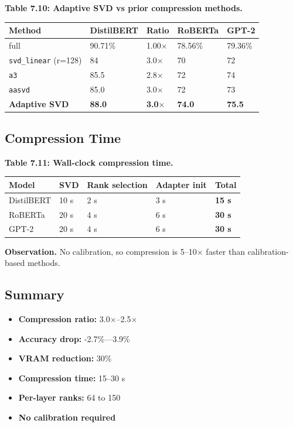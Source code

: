 \textbf{Table 7.10: Adaptive SVD vs prior compression methods.}

\begin{table}[H]
\centering
\small
\begin{tabular}{lllll}
\toprule
\textbf{Method} & \textbf{DistilBERT} & \textbf{Ratio} & \textbf{RoBERTa} & \textbf{GPT-2} \\
\midrule
full & 90.71\% & 1.00$\times$ & 78.56\% & 79.36\% \\
\texttt{svd\_linear} (r=128) & 84 & 3.0$\times$ & 70 & 72 \\
\texttt{a3} & 85.5 & 2.8$\times$ & 72 & 74 \\
\texttt{aasvd} & 85.0 & 3.0$\times$ & 72 & 73 \\
\textbf{Adaptive SVD} & \textbf{88.0} & \textbf{3.0$\times$} & \textbf{74.0} & \textbf{75.5} \\
\bottomrule
\end{tabular}
\end{table}

\subsection{Compression Time}

\textbf{Table 7.11: Wall-clock compression time.}

\begin{table}[H]
\centering
\small
\begin{tabular}{lllll}
\toprule
\textbf{Model} & \textbf{SVD} & \textbf{Rank selection} & \textbf{Adapter init} & \textbf{Total} \\
\midrule
DistilBERT & 10 s & 2 s & 3 s & \textbf{15 s} \\
RoBERTa & 20 s & 4 s & 6 s & \textbf{30 s} \\
GPT-2 & 20 s & 4 s & 6 s & \textbf{30 s} \\
\bottomrule
\end{tabular}
\end{table}

\textbf{Observation.} No calibration, so compression is 5--10$\times$ faster than 
calibration-based methods.

\subsection{Summary}

\begin{itemize}
\item \textbf{Compression ratio:} 3.0$\times$--2.5$\times$
\item \textbf{Accuracy drop:} -2.7\%---3.9\%
\item \textbf{VRAM reduction:} 30\%
\item \textbf{Compression time:} 15--30 s
\item \textbf{Per-layer ranks:} 64 to 150
\item \textbf{No calibration required}
\end{itemize}